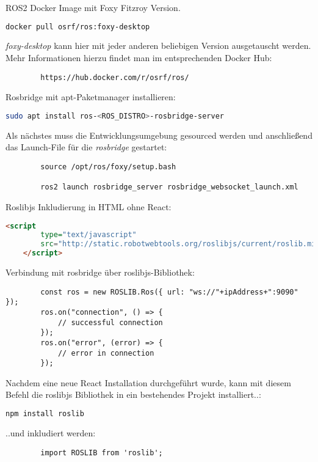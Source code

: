 \begin{flushleft}
    \label{frontend_install}ROS2 Docker Image mit Foxy Fitzroy Version.
    \begin{lstlisting}[language=bash]
        docker pull osrf/ros:foxy-desktop 
    \end{lstlisting}

    \textit{foxy-desktop} kann hier mit jeder anderen beliebigen Version ausgetauscht werden. Mehr Informationen hierzu findet man im entsprechenden Docker Hub: 
    \begin{lstlisting}
        https://hub.docker.com/r/osrf/ros/
    \end{lstlisting}

    Rosbridge mit apt-Paketmanager installieren:
    \begin{lstlisting}[language=bash]
        sudo apt install ros-<ROS_DISTRO>-rosbridge-server 
    \end{lstlisting}

    Als nächstes muss die Entwicklungsumgebung gesourced werden und anschließend das Launch-File für die \textit{rosbridge} gestartet:
    \begin{lstlisting}
        source /opt/ros/foxy/setup.bash
        
        ros2 launch rosbridge_server rosbridge_websocket_launch.xml
    \end{lstlisting}

    Roslibjs Inkludierung in HTML ohne React:
    \begin{lstlisting}[language=html]
    <script 
        type="text/javascript" 
        src="http://static.robotwebtools.org/roslibjs/current/roslib.min.js">
    </script> 
    \end{lstlisting}

    Verbindung mit rosbridge über roslibjs-Bibliothek:
    \begin{lstlisting}
        const ros = new ROSLIB.Ros({ url: "ws://"+ipAddress+":9090" });
        ros.on("connection", () => {
            // successful connection
        });
        ros.on("error", (error) => {
            // error in connection
        });
    \end{lstlisting}

    Nachdem eine neue React Installation durchgeführt wurde, kann mit diesem Befehl die roslibjs Bibliothek in ein bestehendes Projekt installiert..:
    \begin{lstlisting}[language=bash]
        npm install roslib 
    \end{lstlisting}
    
    ..und inkludiert werden:
    
    \begin{lstlisting}
        import ROSLIB from 'roslib';
    \end{lstlisting}
\end{flushleft}